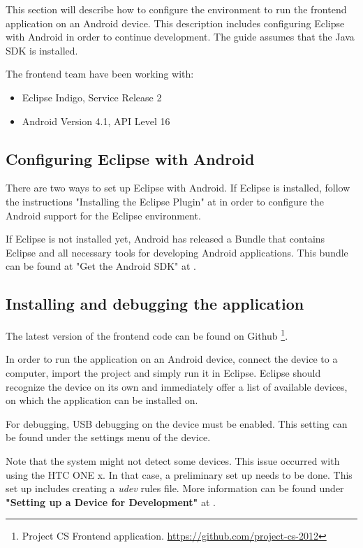 This section will describe how to configure the environment to run the frontend application on an Android device. 
This description includes configuring Eclipse with Android in order to continue development. 
The guide assumes that the Java SDK is installed.

The frontend team have been working with:
\begin{itemize}
\item Eclipse Indigo, Service Release 2
\item Android Version 4.1, API Level 16
\end{itemize}

\subsection{Configuring Eclipse with Android}
There are two ways to set up Eclipse with Android.
If Eclipse is installed, follow
the instructions "Installing the Eclipse Plugin" 
at \cite{android} in order to configure the 
Android support for the Eclipse environment.

If Eclipse is not installed yet, Android has released a Bundle that contains Eclipse and all 
necessary tools for developing Android applications.
This bundle can be found at "Get the Android SDK" at \cite{android}.

\subsection{Installing and debugging the application}
The latest version of the frontend code can be found on Github \footnote{Project CS Frontend application. \url{https://github.com/project-cs-2012}}.

In order to run the application on an Android device, connect the device
to a computer, import the project and simply run it in Eclipse. 
Eclipse should recognize the device on its own and immediately offer a list
of available devices, on which the application can be installed on.

For debugging, USB debugging on the device must be enabled.
This setting can be found under the settings menu of the device.

Note that the system might not detect some devices. This issue occurred with
using the HTC ONE x. In that case, a preliminary set up needs to be done.
This set up includes creating a \textit{udev} rules file. More information
can be found under \textbf{"Setting up a Device for Development"} at
\cite{android}.



